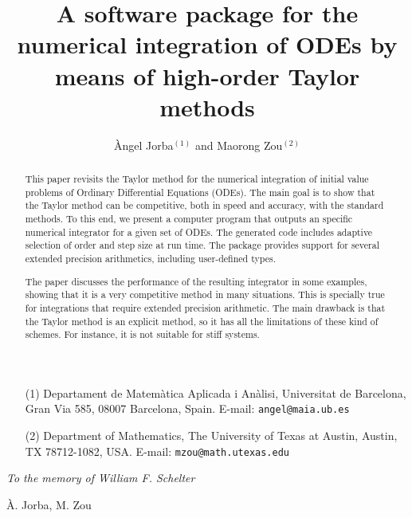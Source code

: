 \documentclass[12pt,twoside]{article}
\title{A software package for the numerical integration of ODEs by
       means of high-order Taylor methods}
\author{\`Angel Jorba$^{(1)}$ and Maorong Zou$^{(2)}$}
\begin{document}
\maketitle
\begin{itemize}
\item[(1)]
Departament de Matem\`atica Aplicada i An\`alisi,
Universitat de Barcelona,\newline
Gran Via 585, 08007 Barcelona, Spain.
E-mail: \texttt{angel@maia.ub.es}

\item[(2)]
Department of Mathematics,
The University of Texas at Austin,\newline
Austin, TX 78712-1082, USA.
E-mail: \texttt{mzou@math.utexas.edu}
\end{itemize}

\bigskip

\hfill\textit{To the memory of William F. Schelter}

\bigskip

\thispagestyle{empty}

\begin{abstract}
  This paper revisits the Taylor method for the numerical integration
  of initial value problems of Ordinary Differential Equations (ODEs).
  The main goal is to show that the Taylor method can be competitive,
  both in speed and accuracy, with the standard methods. To this end,
  we present a computer program that outputs an specific numerical
  integrator for a given set of ODEs. The generated code includes
  adaptive selection of order and step size at run time. The package
  provides support for several extended precision arithmetics,
  including user-defined types.
  
  The paper discusses the performance of the resulting integrator in
  some examples, showing that it is a very competitive method in many
  situations. This is specially true for integrations that require
  extended precision arithmetic. The main drawback is that the Taylor
  method is an explicit method, so it has all the limitations of these
  kind of schemes. For instance, it is not suitable for stiff systems.
\end{abstract}

\newpage

\tableofcontents

\newpage

{\`A. Jorba, M. Zou}
\end{document}
